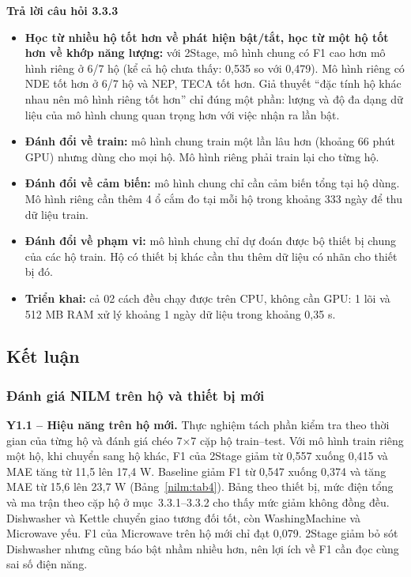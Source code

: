\medskip\noindent\textbf{Trả lời câu hỏi 3.3.3}\par\nopagebreak

\begin{itemize}
\item \textbf{Học từ nhiều hộ tốt hơn về phát hiện bật/tắt, học từ một hộ tốt hơn về khớp năng lượng:} với 2Stage, mô hình chung có F1 cao hơn mô hình riêng ở 6/7 hộ (kể cả hộ chưa thấy: 0,535 so với 0,479). Mô hình riêng có NDE tốt hơn ở 6/7 hộ và NEP, TECA tốt hơn. Giả thuyết “đặc tính hộ khác nhau nên mô hình riêng tốt hơn” chỉ đúng một phần: lượng và độ đa dạng dữ liệu của mô hình chung quan trọng hơn với việc nhận ra lần bật.
\item \textbf{Đánh đổi về train:} mô hình chung train một lần lâu hơn (khoảng 66 phút GPU) nhưng dùng cho mọi hộ. Mô hình riêng phải train lại cho từng hộ.
\item \textbf{Đánh đổi về cảm biến:} mô hình chung chỉ cần cảm biến tổng tại hộ dùng. Mô hình riêng cần thêm 4 ổ cắm đo tại mỗi hộ trong khoảng 333 ngày để thu dữ liệu train.
\item \textbf{Đánh đổi về phạm vi:} mô hình chung chỉ dự đoán được bộ thiết bị chung của các hộ train. Hộ có thiết bị khác cần thu thêm dữ liệu có nhãn cho thiết bị đó.
\item \textbf{Triển khai:} cả 02 cách đều chạy được trên CPU, không cần GPU: 1 lõi và 512 MB RAM xử lý khoảng 1 ngày dữ liệu trong khoảng 0,35 s.
\end{itemize}

\subsection{Kết luận}

\subsubsection{Đánh giá NILM trên hộ và thiết bị mới}

\textbf{Y1.1 – Hiệu năng trên hộ mới.} Thực nghiệm tách phần kiểm tra theo thời gian của từng hộ và đánh giá chéo 7$\times$7 cặp hộ train–test. Với mô hình train riêng một hộ, khi chuyển sang hộ khác, F1 của 2Stage giảm từ 0,557 xuống 0,415 và MAE tăng từ 11,5 lên 17,4 W. Baseline giảm F1 từ 0,547 xuống 0,374 và tăng MAE từ 15,6 lên 23,7 W (Bảng~\ref{nilm:tab4}). Bảng theo thiết bị, mức điện tổng và ma trận theo cặp hộ ở mục~3.3.1–3.3.2 cho thấy mức giảm không đồng đều. Dishwasher và Kettle chuyển giao tương đối tốt, còn WashingMachine và Microwave yếu. F1 của Microwave trên hộ mới chỉ đạt 0,079. 2Stage giảm bỏ sót Dishwasher nhưng cũng báo bật nhầm nhiều hơn, nên lợi ích về F1 cần đọc cùng sai số điện năng.


